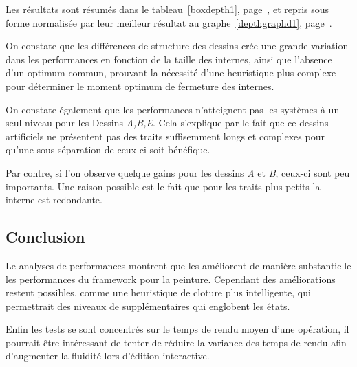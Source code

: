 				Les résultats sont résumés dans le tableau~\ref{boxdepth1}, page~\pageref{boxdepth1}, et repris sous forme normalisée par leur
				meilleur résultat au graphe~\ref{depthgraphd1}, page~\pageref{depthgraphd1}. 

				On constate que les différences de structure des dessins crée une grande variation dans les performances en fonction de
				la taille des \BO internes, ainsi que l'absence d'un optimum commun, prouvant la nécessité d'une heuristique plus complexe
				pour déterminer le moment optimum de fermeture des \BO internes. 

				On constate également que les performances n'atteignent pas les systèmes à un seul niveau pour les Dessins \emph{A,B,E}.
				Cela s'explique par le fait que ce dessins artificiels ne présentent pas des traits suffisemment longs et complexes pour 
				qu'une sous-séparation de ceux-ci soit bénéfique. 

				Par contre, si l'on observe quelque gains pour les dessins \emph{A} et \emph{B}, ceux-ci sont peu importants. Une raison possible
				est le fait que pour les traits plus petits la \BO interne est redondante. 
				
			\subsection{Conclusion}
				Le analyses de performances montrent que les \BO améliorent de manière substantielle les performances du framework pour la peinture.
				Cependant des améliorations restent possibles, comme une heuristique de cloture plus intelligente, qui permettrait des niveaux de 
				\BO supplémentaires qui englobent les états. 

				Enfin les tests se sont concentrés sur le temps de rendu moyen d'une opération, il pourrait être intéressant de tenter de réduire
				la variance des temps de rendu afin d'augmenter la fluidité lors d'édition interactive. 

